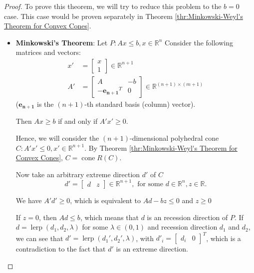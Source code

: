 \begin{proof}
  To prove this theorem, we will try to reduce this problem to the \( b = 0 \)
  case. This case would be proven separately in Theorem
  \ref{thr:Minkowski-Weyl's
  Theorem for Convex Cones}.

  \begin{itemize}
  \item \textbf{Minkowski's Theorem}: Let \( P: Ax \le  b, x \in \mathbb{R}^{n}
    \) Consider the following matrices and
    vectors:
\begin{align*}
  x' &= \begin{bmatrix} x \\ 1 \end{bmatrix} \in \mathbb{R}^{n+1} \\
  A' &= \begin{bmatrix} A & -b \\ -\mathbf{e_{n+1}}^{T} & 0 \end{bmatrix}
  \in \mathbb{R}^{(n + 1) \times  (m + 1)}
\end{align*} (\( \mathbf{e_{n+1}} \) is the \( (n+1) \)-th standard basis
(column) vector).

Then \( Ax \ge b \) if and only if \( A'x' \ge  0 \).

Hence, we will consider the \( (n+1) \)-dimensional polyhedral cone \( C: A'x'
\le  0, x' \in \mathbb{R}^{n+1} \). By Theorem \ref{thr:Minkowski-Weyl's Theorem
for Convex Cones}, \( C = \operatorname{cone} R(C)
\).

    Now take an arbitrary extreme direction \( d' \) of \( C \)
    \[
      d' = \begin{bmatrix} d & z \end{bmatrix} \in \mathbb{R}^{n+1}, \text{ for
      some } d \in \mathbb{R}^{n}, z \in \mathbb{R}
    .\] 

    We have \( A'd' \ge  0 \), which is equivalent to \( Ad - bz \le  0 \) and
    \( z \ge  0 \)

    If \( z = 0 \), then \( Ad \le  b \), which means that \( d \) is an
    recession direction of \( P \). If \( d = \operatorname{lerp}(d_{1}, d_{2},
    \lambda) \) for some \( \lambda \in (0, 1) \) and recession direction \(
    d_{1} \) and \( d_{2} \), we can see that \( d' =
    \operatorname{lerp}(d_{1}', d_{2}', \lambda) \), with \( d'_{i} =
        \begin{bmatrix} d_{i} & 0 \end{bmatrix}^{T}  \), which is a
        contradiction to the fact that \( d' \) is an extreme direction.
    

\end{itemize}
\end{proof}
